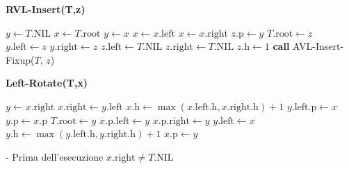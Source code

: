 \documentclass[a4paper,12pt]{article}
\begin{document}
\begin{minipage}[t]{0.45\textwidth}
    \textbf{RVL-Insert(T,z)}
    \begin{algorithmic}[1]
    \State $y \gets T.\text{NIL}$
    \State $x \gets T.\text{root}$
        \State $y \gets x$
            \State $x \gets x.\text{left}$
        \Else
            \State $x \gets x.\text{right}$
        \EndIf
    \EndWhile
    \State $z.\text{p} \gets y$
        \State $T.\text{root} \gets z$
        \State $y.\text{left} \gets z$
    \Else
        \State $y.\text{right} \gets z$
    \EndIf
    \State $z.\text{left} \gets T.\text{NIL}$
    \State $z.\text{right} \gets T.\text{NIL}$
    \State $z.\text{h} \gets 1$
    \State \textbf{call} AVL-Insert-Fixup($T$, $z$)
    \end{algorithmic}
\end{minipage}
\begin{minipage}[t]{0.5\textwidth}
    \textbf{Left-Rotate(T,x)}
    \begin{algorithmic}[1]
    \State $y \gets x.\text{right}$ 
    \State $x.\text{right} \gets y.\text{left}$ 
    \State $x.\text{h} \gets \max(x.\text{left}.\text{h}, x.\text{right}.\text{h}) + 1$
        \State $y.\text{left}.\text{p} \gets x$
    \EndIf
    \State $y.\text{p} \gets x.\text{p}$ 
        \State $T.\text{root} \gets y$
        \State $x.\text{p}.\text{left} \gets y$
    \Else
        \State $x.\text{p}.\text{right} \gets y$
    \EndIf
    \State $y.\text{left} \gets x$ 
    \State $y.\text{h} \gets \max(y.\text{left}.\text{h}, y.\text{right}.\text{h}) + 1$
    \State $x.\text{p} \gets y$
    \end{algorithmic}
    
    \begin{flushleft}
    - Prima dell'esecuzione $x.\text{right} \neq T.\text{NIL}$
    \end{flushleft}
\end{minipage}
\end{document}
